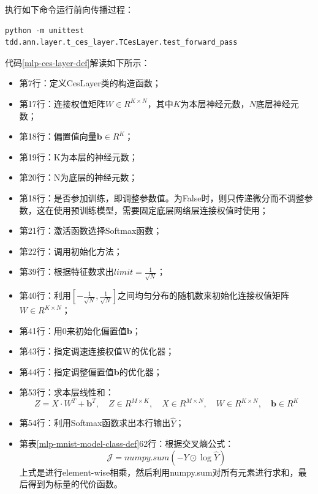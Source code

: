 \documentclass[UTF8]{article}
\begin{document}
执行如下命令运行前向传播过程：
\begin{lstlisting}
python -m unittest tdd.ann.layer.t_ces_layer.TCesLayer.test_forward_pass
\end{lstlisting}
代码\ref{mlp-ces-layer-def}解读如下所示：
\begin{itemize}
\item 第7行：定义CesLayer类的构造函数；
\item 第17行：连接权值矩阵$W \in R^{K \times N}$，其中$K$为本层神经元数，$N$底层神经元数；
\item 第18行：偏置值向量$\boldsymbol{b} \in R^{K}$；
\item 第19行：K为本层的神经元数；
\item 第20行：N为底层的神经元数；
\item 第18行：是否参加训练，即调整参数值。为False时，则只传递微分而不调整参数，这在使用预训练模型，需要固定底层网络层连接权值时使用；
\item 第21行：激活函数选择Softmax函数；
\item 第22行：调用初始化方法；
\item 第39行：根据特征数求出$limit=\frac{1}{\sqrt{N}}$；
\item 第40行：利用$[ -\frac{1}{\sqrt{N}}, \frac{1}{\sqrt{N}} ]$之间均匀分布的随机数来初始化连接权值矩阵$W \in R^{K \times N}$；
\item 第41行：用0来初始化偏置值$\boldsymbol{b}$；
\item 第43行：指定调速连接权值W的优化器；
\item 第44行：指定调整偏置值$\boldsymbol{b}$的优化器；
\item 第53行：求本层线性和：
\begin{equation}
Z=X \cdot W^{T} + \boldsymbol{b}^{T}, \quad Z \in R^{M \times K}, \quad X \in R^{M \times N}, \quad W \in R^{K \times N}, \quad \boldsymbol{b} \in R^{K}
\label{mlp-ces-layer-forward-pass-Z-def}
\end{equation}
\item 第54行：利用Softmax函数求出本行输出$\hat{Y}$；
\item 第表\ref{mlp-mnist-model-class-def}62行：根据交叉熵公式：
\begin{equation}
\mathcal{J} = numpy.sum(-Y \odot \log{\hat{Y}})
\label{mlp-ces-layer-forward-pass-cross-entropy-def}
\end{equation}
上式是进行element-wise相乘，然后利用numpy.sum对所有元素进行求和，最后得到为标量的代价函数。
\end{itemize}
\end{document}
